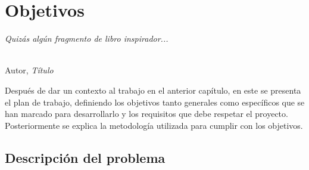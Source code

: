 \chapter{Objetivos}
\label{cap:capitulo2}

\begin{flushright}
\begin{minipage}[]{10cm}
\emph{Quizás algún fragmento de libro inspirador...}\\
\end{minipage}\\

Autor, \textit{Título}\\
\end{flushright}

\vspace{1cm}

Después de dar un contexto al trabajo en el anterior capítulo, en este se presenta el plan de trabajo, definiendo los objetivos tanto generales como específicos que se han marcado para desarrollarlo y los requisitos que debe respetar el proyecto. Posteriormente se explica la metodología utilizada para cumplir con los objetivos.\\

\section{Descripción del problema}
\label{sec:descripcion}

